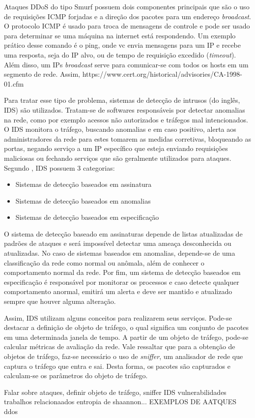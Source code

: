 Ataques DDoS do tipo Smurf possuem dois componentes principais que são o uso de requisições ICMP forjadas e a direção dos pacotes para um endereço \textit{broadcast}. O protocolo ICMP é usado para troca de mensagens de controle e pode ser usado para determinar se uma máquina na internet está respondendo. Um exemplo prático desse comando é o ping, onde vc envia mensagens para um IP e recebe uma resposta, seja do IP alvo, ou de tempo de requisição excedido (\textit{timeout}). Além disso, um IPs \textit{broadcast} serve para comunicar-se com todos os hosts em um segmento de rede. Assim, https://www.cert.org/historical/advisories/CA-1998-01.cfm

Para tratar esse tipo de problema, sistemas de detecção de intrusos (do inglês, IDS) são utilizados. Tratam-se de softwares responsáveis  por detectar anomalias na rede, como por exemplo acessos não autorizados e tráfegos mal intencionados. O IDS monitora o tráfego, buscando anomalias e em caso positivo, alerta aos administradores da rede para estes tomarem as medidas corretivas, bloqueando as portas, negando serviço a um IP específico que esteja enviando requisições maliciosas ou fechando serviços que são geralmente utilizados para ataques. Segundo \cite{Ashoor2011}, IDS possuem 3 categorias: 
\begin{itemize}
	\item Sistemas de detecção baseados em assinatura
	\item Sistemas de detecção baseados em anomalias
	\item Sistemas de detecção baseados em especificação
\end{itemize}

O sistema de detecção baseado em assinaturas depende de listas atualizadas de padrões de ataques e será impossível detectar uma ameaça desconhecida ou atualizadas. No caso de sistemas baseados em anomalias, depende-se de uma classificação da rede como normal ou anômala, além de conhecer o comportamento normal da rede. Por fim, um sistema de detecção baseados em especificação é responsável por monitorar os processos e caso detecte qualquer comportamento anormal, emitirá um alerta e deve ser mantido e atualizado sempre que houver alguma alteração.

Assim, IDS utilizam alguns conceitos para realizarem seus serviços. Pode-se destacar a definição de objeto de tráfego, o qual significa um conjunto de pacotes em uma determinada janela de tempo. A partir de um objeto de tráfego, pode-se calcular métricas de avaliação da rede. Vale ressaltar que para a obtenção de objetos de tráfego, faz-se necessário o uso de \textit{sniffer}, um analisador de rede que captura o tráfego que entra e sai. Desta forma, os pacotes são capturados e calculam-se os parâmetros do objeto de tráfego.

 


Falar sobre ataques, definir objeto de tráfego, sniffer IDS vulnerabilidades trabalhos relacionaados entropia de shaannon... EXEMPLOS DE AATQUES ddos
   

